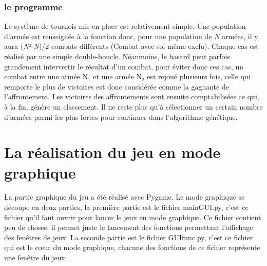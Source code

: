 \documentclass{article}
\begin{document}
	\subsubsection{le programme}
		Le système de tournois mis en place est relativement simple. Une population d'armée est renseignée à la fonction donc, pour une population de \textit{N} armées, il y aura (\textit{N}²-\textit{N})/2 combats différents (Combat avec soi-même exclu). Chaque cas est réalisé par une simple double-boucle. Néanmoins, le hasard peut parfois grandement intervertir le résultat d'un combat, pour éviter donc ces cas, un combat entre une armée \textit{$\textrm{N}_\textrm{1}$} et une armée \textit{\textit{$\textrm{N}_\textrm{2}$}} est rejoué plusieurs fois, celle qui remporte le plus de victoires est donc considérée comme la gagnante de l'affrontement. Les victoires des affrontements sont ensuite comptabilisées ce qui, à la fin, génère un classement. Il ne reste plus qu'à sélectionner un certain nombre d'armées parmi les plus fortes pour continuer dans l'algorithme génétique.


\section{La réalisation du jeu en mode graphique}
	La partie graphique du jeu a été réalisé avec Pygame. Le mode graphique se découpe en deux parties, la première partie est le fichier mainGUI.py, c'est ce fichier qu'il faut ouvrir pour lancer le jeux en mode graphique. Ce fichier contient peu de choses, il permet juste le lancement des fonctions permettant l'affichage des fenêtres de jeux. La seconde partie est le fichier GUIfunc.py, c'est ce fichier qui est le cœur du mode graphique, chacune des fonctions de ce fichier représente une fenêtre du jeux.
	
\end{document}
